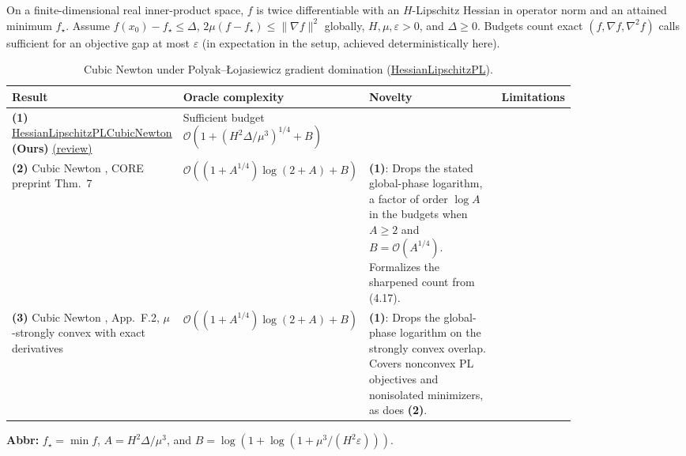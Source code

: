 \begin{table}[tp]
\centering
\caption{Cubic Newton under \texorpdfstring{Polyak--\L{}ojasiewicz}{Polyak--Lojasiewicz} gradient domination (\protect\href{https://github.com/k3nfalt/longtails/blob/main/LongTails/Setups/HessianLipschitzPL.lean}{HessianLipschitzPL}).}\label{tab:HessianLipschitzPL}
\parbox{\linewidth}{\footnotesize On a finite-dimensional real inner-product space, $f$ is twice differentiable with an $H$-Lipschitz Hessian in operator norm and an attained minimum $f_\star$. Assume $f(x_0)-f_\star\le\Delta$, $2\mu(f-f_\star)\le\|\nabla f\|^2$ globally, $H,\mu,\varepsilon>0$, and $\Delta\ge0$. Budgets count exact $(f,\nabla f,\nabla^2 f)$ calls sufficient for an objective gap at most $\varepsilon$ (in expectation in the setup, achieved deterministically here).}\par\smallskip
\begin{threeparttable}
\footnotesize
\setlength{\tabcolsep}{4pt}\renewcommand{\arraystretch}{1.25}
\begin{tabularx}{\linewidth}{@{}>{\raggedright\arraybackslash}p{0.22\linewidth}>{\raggedright\arraybackslash}p{0.29\linewidth}>{\raggedright\arraybackslash}p{0.32\linewidth}>{\raggedright\arraybackslash}X@{}}
\toprule
\textbf{Result} & \textbf{Oracle complexity} & \textbf{Novelty} & \textbf{Limitations} \\
\midrule
\textbf{(1)} \href{https://github.com/k3nfalt/longtails/blob/main/LongTails/Theorems/HessianLipschitzPLCubicNewton.lean}{Hessian\allowbreak{}Lipschitz\allowbreak{}PL\allowbreak{}Cubic\allowbreak{}Newton} \textbf{(Ours)} \href{https://github.com/k3nfalt/longtails/blob/main/scripts/reviews/HessianLipschitzPLCubicNewton.md}{(review)}
& Sufficient budget $\mathcal{O}(1+(H^2\Delta/\mu^3)^{1/4}+B)$ & & \\
\midrule[1.2pt]
\textbf{(2)} Cubic Newton \citep{hlplNP2006CORE}, CORE preprint Thm.~7
& $\mathcal{O}((1+A^{1/4})\log(2+A)+B)$
& \textbf{(1)}: Drops the stated global-phase logarithm, a factor of order $\log A$ in the budgets when $A\ge2$ and $B=\mathcal{O}(A^{1/4})$. Formalizes the sharpened count from (4.17).
& \\
\midrule
\textbf{(3)} Cubic Newton \citep{hlplCDJv5}, App.~F.2, $\mu$-strongly convex with exact derivatives
& $\mathcal{O}((1+A^{1/4})\log(2+A)+B)$
& \textbf{(1)}: Drops the global-phase logarithm on the strongly convex overlap. Covers nonconvex PL objectives and nonisolated minimizers, as does \textbf{(2)}.
& \\
\bottomrule
\end{tabularx}
\begin{tablenotes}[flushleft]\footnotesize
\item[] \textbf{Abbr:} $f_\star=\min f$, $A=H^2\Delta/\mu^3$, and $B=\log(1+\log(1+\mu^3/(H^2\varepsilon)))$.
\end{tablenotes}
\end{threeparttable}
\end{table}
